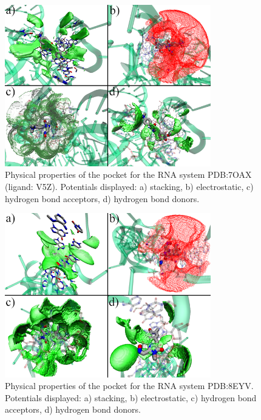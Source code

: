 \begin{figure}[H]
  \centering
  \includegraphics[width=0.8\textwidth]{figures/appendix/benchmark_rna/7oax1.png}
  \caption{\label{fig:appx_benchmark/7oax1} Physical properties of the pocket for the RNA system PDB:7OAX (ligand: V5Z). Potentials displayed: a) stacking, b) electrostatic, c) hydrogen bond acceptors, d) hydrogen bond donors.}
\end{figure}

\begin{figure}[H]
  \centering
  \includegraphics[width=0.8\textwidth]{figures/appendix/benchmark_rna/8eyv.png}
  \caption{\label{fig:appx_benchmark/8eyv} Physical properties of the pocket for the RNA system PDB:8EYV. Potentials displayed: a) stacking, b) electrostatic, c) hydrogen bond acceptors, d) hydrogen bond donors.}
\end{figure}


